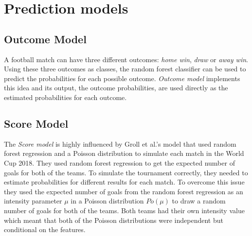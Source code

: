 \section{Prediction models}
\subsection{Outcome Model}
A football match can have three different outcomes: \textit{home win}, \textit{draw} or \textit{away win}. Using these three outcomes as classes, the random forest classifier can be used to predict the probabilities for each possible outcome. \textit{Outcome model} implements this idea and its output, the outcome probabilities, are used directly as the estimated probabilities for each outcome.
\subsection{Score Model}
The \textit{Score model} is highly influenced by Groll et al.'s \cite{groll2018prediction} model that used random forest regression and a Poisson distribution to simulate each match in the World Cup 2018. They used random forest regression to get the expected number of goals for both of the teams. To simulate the tournament correctly, they needed to estimate probabilities for different results for each match. To overcome this issue they used the expected number of goals from the random forest regression as an intensity parameter $\mu$ in a Poisson distribution $Po(\mu)$ to draw a random number of goals for both of the teams. Both teams had their own intensity value which meant that both of the Poisson distributions were independent but conditional on the features.


